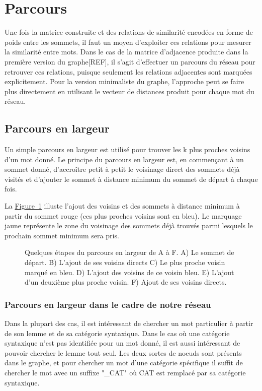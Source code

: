 \section{Parcours}

Une fois la matrice construite et des relations de similarité encodées en forme de poids entre les sommets, il faut un moyen d'exploiter ces relations pour mesurer la similarité entre mots. Dans le cas de la matrice d'adjacence produite dans la première version du graphe[REF], il s'agit d'effectuer un parcours du réseau pour retrouver ces relations, puisque seulement les relations adjacentes sont marquées explicitement. Pour la version minimaliste du graphe, l'approche peut se faire plus directement en utilisant le vecteur de distances produit pour chaque mot du réseau.

\subsection{Parcours en largeur}

Un simple parcours en largeur est utilisé pour trouver les k plus proches voisins d'un mot donné. Le principe du parcours en largeur est, en commençant à un sommet donné, d'accroître petit à petit le voisinage direct des sommets déjà visités et d'ajouter le sommet à distance minimum du sommet de départ à chaque fois.

La \hyperref[fig:bfs]{Figure~\ref*{fig:bfs}} illuste l'ajout des voisins et des sommets à distance minimum à partir du sommet rouge (ces plus proches voisins sont en bleu). Le marquage jaune représente le zone du voisinage des sommets déjà trouvés parmi lesquels le prochain sommet minimum sera pris.

\begin{figure}[!ht]
\centering
\def\svgwidth{\columnwidth}

\caption{Quelques étapes du parcours en largeur de A à F. A) Le sommet de départ. B) L'ajout de ses voisins directs
C) Le plus proche voisin marqué en bleu. D) L'ajout des voisins de ce voisin bleu. E) L'ajout d'un deuxième plus proche voisin. F) Ajout de ses voisins directs.}
\label{fig:bfs}
\end{figure}

\subsubsection{Parcours en largeur dans le cadre de notre réseau}

Dans la plupart des cas, il est intéressant de chercher un mot particulier à partir de son lemme et de sa catégorie syntaxique. Dans le cas où une catégorie syntaxique n'est pas identifiée pour un mot donné, il est aussi intéressant de pouvoir chercher le lemme tout seul. Les deux sortes de noeuds sont présents dans le graphe, et pour chercher un mot d'une catégorie spécifique il suffit de chercher le mot avec un suffixe "_CAT" où CAT est remplacé par sa catégorie syntaxique.






